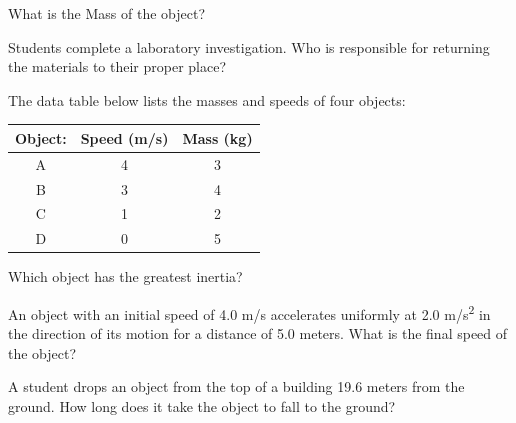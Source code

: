 \documentclass[10pt]{examdesign}
\begin{document}
\begin{multiplechoice} [title={Multiple Choice},
	rearrange=yes]
\begin{question}
	What is the Mass of the object?
	
\end{question}

\begin{question}
	Students complete a laboratory investigation.  Who is responsible for returning the materials to their proper place?
	\end{question}




\begin{question}
The data table below lists the masses and speeds of four objects:


\begin{center}
	\begin{tabular}{ | c | c | c | }
	\hline
		Object: & Speed (m/s) & Mass (kg) \\ 
		\hline
		A & 4 & 3 \\  
		\hline
		B & 3 & 4    \\
		\hline
		C & 1 & 2    \\
		\hline
		D & 0 & 5    \\
		\hline
	\end{tabular}
\end{center}

Which object has the greatest inertia?

\end{question}




\begin{question}
An object with an initial speed of 4.0 m/s accelerates uniformly at 2.0 m/s\textsuperscript{2} in the direction of its motion for a distance of 5.0 meters. What is the
final speed of the object? 
	\end{question}

\begin{question}
A student drops an object from the top of a building 19.6 meters from the ground. How long does it take the object to fall to the ground? 
\end{question}



\end{multiplechoice}
\end{document}

